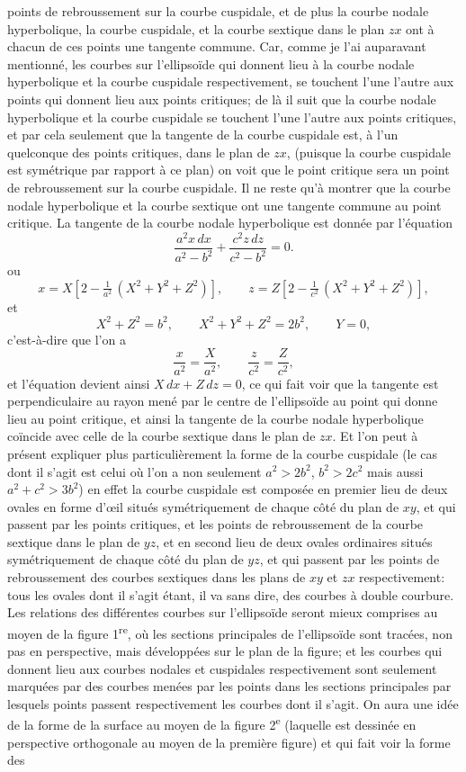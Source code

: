 \documentclass[11pt]{article}
\begin{document}
\noindent points de rebroussement sur la courbe cuspidale, et de plus la courbe nodale hyperbolique, la courbe cuspidale, et la courbe sextique dans le plan $zx$ ont à chacun de ces points une tangente commune. Car, comme je l'ai auparavant mentionné, les courbes sur l'ellipsoïde qui donnent lieu à la courbe nodale hyperbolique et la courbe cuspidale respectivement, se touchent l'une l'autre aux points qui donnent lieu aux points critiques; de là il suit que la courbe nodale hyperbolique et la courbe cuspidale se touchent l'une l'autre aux points critiques, et par cela seulement que la tangente de la courbe cuspidale est, à l'un quelconque des points critiques, dans le plan de $zx$, (puisque la courbe cuspidale est symétrique par rapport à ce plan) on voit que le point critique sera un point de rebroussement sur la courbe cuspidale. Il ne reste qu'à montrer que la courbe nodale hyperbolique et la courbe sextique ont une tangente commune au point critique. La tangente de la courbe nodale hyperbolique est donnée par l'équation
\[
\frac{a^2x\,dx}{a^2-b^2} + \frac{c^2z\,dz}{c^2-b^2} = 0.
\]
ou
\[
x = X\left[2 - \tfrac{1}{a^2}\,(X^2 + Y^2 + Z^2)\right],\qquad z = Z\left[2 - \tfrac{1}{c^2}\,(X^2 + Y^2 + Z^2)\right],
\]
et
\[
X^2 + Z^2 = b^2,\qquad X^2 + Y^2 + Z^2 = 2b^2,\qquad Y = 0,
\]
c'est-à-dire que l'on a
\[
\frac{x}{a^2} = \frac{X}{a^2},\qquad \frac{z}{c^2} = \frac{Z}{c^2},
\]
et l'équation devient ainsi $X\,dx + Z\,dz = 0$, ce qui fait voir que la tangente est perpendiculaire au rayon mené par le centre de l'ellipsoïde au point qui donne lieu au point critique, et ainsi la tangente de la courbe nodale hyperbolique coïncide avec celle de la courbe sextique dans le plan de $zx$. Et l'on peut à présent expliquer plus particulièrement la forme de la courbe cuspidale (le cas dont il s'agit est celui où l'on a non seulement $a^2 > 2b^2$, $b^2 > 2c^2$ mais aussi $a^2 + c^2 > 3b^2$) en effet la courbe cuspidale est composée en premier lieu de deux ovales en forme d'\oe il situés symétriquement de chaque côté du plan de $xy$, et qui passent par les points critiques, et les points de rebroussement de la courbe sextique dans le plan de $yz$, et en second lieu de deux ovales ordinaires situés symétriquement de chaque côté du plan de $yz$, et qui passent par les points de rebroussement des courbes sextiques dans les plans de $xy$ et $zx$ respectivement: tous les ovales dont il s'agit étant, il va sans dire, des courbes à double courbure. Les relations des différentes courbes sur l'ellipsoïde seront mieux comprises au moyen de la figure 1\textsuperscript{re}, où les sections principales de l'ellipsoïde sont tracées, non pas en perspective, mais développées sur le plan de la figure; et les courbes qui donnent lieu aux courbes nodales et cuspidales respectivement sont seulement marquées par des courbes menées par les points dans les sections principales par lesquels points passent respectivement les courbes dont il s'agit. On aura une idée de la forme de la surface au moyen de la figure 2\textsuperscript{e} (laquelle est dessinée en perspective orthogonale au moyen de la première figure) et qui fait voir la forme des
\end{document}
